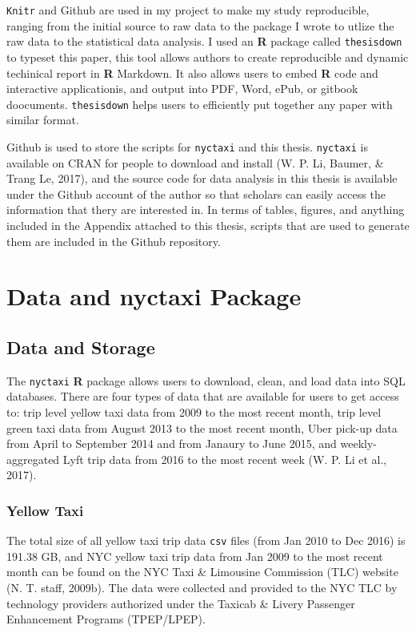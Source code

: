 \documentclass[12pt,twoside]{reedthesis}
\theoremstyle{definition}
\theoremstyle{definition}
\theoremstyle{definition}
\theoremstyle{remark}
\begin{document}
\texttt{Knitr} and Github are used in my project to make my study
reproducible, ranging from the initial source to raw data to the package
I wrote to utlize the raw data to the statistical data analysis. I used
an \textbf{R} package called \texttt{thesisdown} to typeset this paper,
this tool allows authors to create reproducible and dynamic techinical
report in \textbf{R} Markdown. It also allows users to embed \textbf{R}
code and interactive applicationis, and output into PDF, Word, ePub, or
gitbook doocuments. \texttt{thesisdown} helps users to efficiently put
together any paper with similar format.

Github is used to store the scripts for \texttt{nyctaxi} and this
thesis. \texttt{nyctaxi} is available on CRAN for people to download and
install (W. P. Li, Baumer, \& Trang Le, 2017), and the source code for
data analysis in this thesis is available under the Github account of
the author so that scholars can easily access the information that thery
are interested in. In terms of tables, figures, and anything included in
the Appendix attached to this thesis, scripts that are used to generate
them are included in the Github repository.

\chapter{Data and nyctaxi Package}\label{chapter2}

\section{Data and Storage}\label{data-and-storage}

The \texttt{nyctaxi} \textbf{R} package allows users to download, clean,
and load data into SQL databases. There are four types of data that are
available for users to get access to: trip level yellow taxi data from
2009 to the most recent month, trip level green taxi data from August
2013 to the most recent month, Uber pick-up data from April to September
2014 and from Janaury to June 2015, and weekly-aggregated Lyft trip data
from 2016 to the most recent week (W. P. Li et al., 2017).

\subsection{Yellow Taxi}\label{yellow-taxi-1}

The total size of all yellow taxi trip data \texttt{csv} files (from Jan
2010 to Dec 2016) is 191.38 GB, and NYC yellow taxi trip data from Jan
2009 to the most recent month can be found on the NYC Taxi \& Limousine
Commission (TLC) website (N. T. staff, 2009b). The data were collected
and provided to the NYC TLC by technology providers authorized under the
Taxicab \& Livery Passenger Enhancement Programs (TPEP/LPEP).
\end{document}
